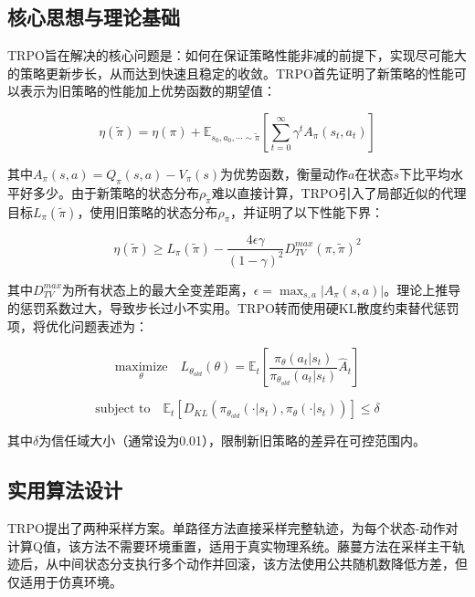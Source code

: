 \documentclass[12pt,a4paper]{article}
\begin{document}
\subsection{核心思想与理论基础}

TRPO旨在解决的核心问题是：如何在保证策略性能非减的前提下，实现尽可能大的策略更新步长，从而达到快速且稳定的收敛。TRPO首先证明了新策略的性能可以表示为旧策略的性能加上优势函数的期望值：

\begin{equation}
\eta(\tilde{\pi}) = \eta(\pi) + \mathbb{E}_{s_0,a_0,\cdots\sim\tilde{\pi}}\left[\sum_{t=0}^{\infty}\gamma^t A_{\pi}(s_t,a_t)\right]
\end{equation}

其中$A_{\pi}(s,a)=Q_{\pi}(s,a)-V_{\pi}(s)$为优势函数，衡量动作$a$在状态$s$下比平均水平好多少。由于新策略的状态分布$\rho_{\tilde{\pi}}$难以直接计算，TRPO引入了局部近似的代理目标$L_{\pi}(\tilde{\pi})$，使用旧策略的状态分布$\rho_{\pi}$，并证明了以下性能下界：

\begin{equation}
\eta(\tilde{\pi}) \geq L_{\pi}(\tilde{\pi}) - \frac{4\epsilon\gamma}{(1-\gamma)^2}D_{TV}^{max}(\pi,\tilde{\pi})^2
\end{equation}

其中$D_{TV}^{max}$为所有状态上的最大全变差距离，$\epsilon=\max_{s,a}|A_{\pi}(s,a)|$。理论上推导的惩罚系数过大，导致步长过小不实用。TRPO转而使用硬KL散度约束替代惩罚项，将优化问题表述为：

\begin{equation}
\underset{\theta}{\text{maximize}} \quad L_{\theta_{old}}(\theta) = \mathbb{E}_t\left[\frac{\pi_{\theta}(a_t|s_t)}{\pi_{\theta_{old}}(a_t|s_t)}\hat{A}_t\right]
\end{equation}

\begin{equation}
\text{subject to} \quad \mathbb{E}_t\left[D_{KL}(\pi_{\theta_{old}}(\cdot|s_t),\pi_{\theta}(\cdot|s_t))\right] \leq \delta
\end{equation}

其中$\delta$为信任域大小（通常设为0.01），限制新旧策略的差异在可控范围内。

\subsection{实用算法设计}

TRPO提出了两种采样方案。单路径方法直接采样完整轨迹，为每个状态-动作对计算Q值，该方法不需要环境重置，适用于真实物理系统。藤蔓方法在采样主干轨迹后，从中间状态分支执行多个动作并回滚，该方法使用公共随机数降低方差，但仅适用于仿真环境。
\end{document}
